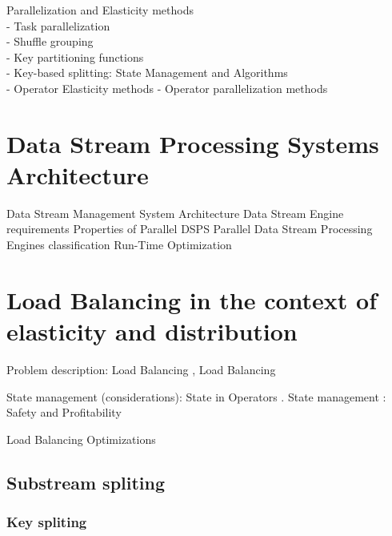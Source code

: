   Parallelization and Elasticity methods \cite{R_ger_2019}\\
  - Task parallelization \cite{R_ger_2019}\\
  - Shuffle grouping \cite{R_ger_2019}\\
  - Key partitioning functions \cite{R_ger_2019}\\
  - Key-based splitting: State Management and Algorithms \cite{R_ger_2019}\\
  - Operator Elasticity methods \cite{R_ger_2019}
  - Operator parallelization methods \cite{R_ger_2019}

  \section{Data Stream Processing Systems Architecture}
  Data Stream Management System Architecture\cite{chakravarthy2009stream}
  Data Stream Engine requirements  \cite{kamburugamuve2013survey}
  Properties of Parallel DSPS \cite{R_ger_2019}
  Parallel Data Stream Processing Engines classification \cite{R_ger_2019}
  Run-Time Optimization\cite{chakravarthy2009stream}

  \section{Load Balancing in the context of elasticity and distribution}
  Problem description: Load Balancing  \cite{Hirzel_2014},   Load Balancing \cite{R_ger_2019}

  State management (considerations): State in Operators \cite{R_ger_2019}. State management \cite{R_ger_2019}: Safety and Profitability \cite{Schneider_2013R_ger_2019}

  Load Balancing Optimizations

  \subsection{Substream spliting}
  \subsubsection{Key spliting}
